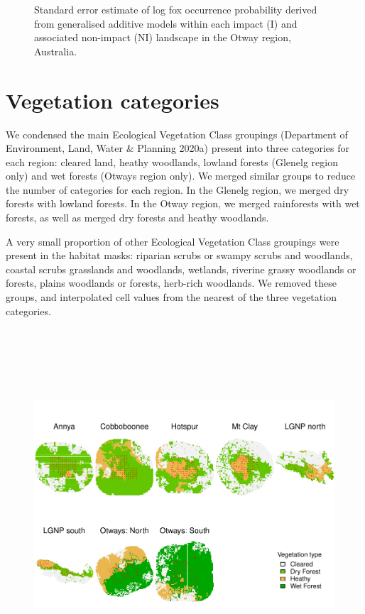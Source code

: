 \documentclass[11pt,a4paper,titlepage,twoside,openright]{style/unimelbthesis}
\begin{document}
\begin{mainmatter}
\begin{figure}
{}

\caption{Standard error estimate of log fox occurrence probability derived from generalised additive models within each impact (I) and associated non-impact (NI) landscape in the Otway region, Australia.}\label{fig:density-fox-se-o}
\end{figure}
\newpage

\hypertarget{density-app-veg}{%
\section{Vegetation categories}\label{density-app-veg}}

We condensed the main Ecological Vegetation Class groupings (Department of Environment, Land, Water \& Planning 2020a) present into three categories for each region: cleared land, heathy woodlands, lowland forests (Glenelg region only) and wet forests (Otways region only). We merged similar groups to reduce the number of categories for each region. In the Glenelg region, we merged dry forests with lowland forests. In the Otway region, we merged rainforests with wet forests, as well as merged dry forests and heathy woodlands.

A very small proportion of other Ecological Vegetation Class groupings were present in the habitat masks: riparian scrubs or swampy scrubs and woodlands, coastal scrubs grasslands and woodlands, wetlands, riverine grassy woodlands or forests, plains woodlands or forests, herb-rich woodlands. We removed these groups, and interpolated cell values from the nearest of the three vegetation categories.

\newpage

\(~\)

\(~\)

\(~\)
\begin{figure}

{\centering \includegraphics[width=1\linewidth]{figure/density-veg-1} 

}
\end{figure}
\end{mainmatter}
\end{document}
